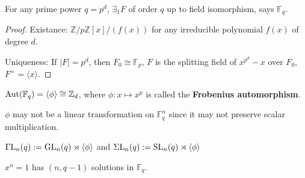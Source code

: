 \documentclass[a4paper,11pt]{article}
\begin{document}
\begin{proposition}
    For any prime power $q=p^d$, $\exists_1 F$ of order $q$ up to field isomorphism, says $\mathbb{F}_q$. 
\end{proposition}
\begin{proof}
    Existance: $\mathbb{Z}/p\mathbb{Z}[x]/(f(x))$ for any irreducible polynomial $f(x)$ of degree $d$.

    Uniqueness: If $|F|=p^d$, then $F_0\cong \mathbb{F}_p$,  $F$ is the splitting field of $x^{p^d}-x$ over $F_0$, $F^\times=\langle x\rangle$. 
\end{proof}

\begin{lemma}
    $\mathrm{Aut}(\mathbb{F}_q)=\langle \phi\rangle\cong\mathbb{Z}_d$, where $\phi:x\mapsto x^p$ is called the \textbf{Frobenius automorphism}.
\end{lemma}

\begin{remark}
    $\phi$ may not be a linear transformation on $\mathbb{F}_q^n$ since it may not preserve scalar multiplication.
\end{remark}

\begin{definition}
    $\mathrm{\Gamma L}_n(q):=\mathrm{GL}_n(q)\rtimes\langle \phi\rangle$ and $\mathrm{\Sigma L}_n(q):=\mathrm{SL}_n(q)\rtimes\langle \phi\rangle$
\end{definition}

\begin{lemma}
    $x^n=1$ has $(n,q-1)$ solutions in $\mathbb{F}_q$.
\end{lemma}


\ifx\ChapThreeSecOne\undefined %
     
\end{document}
